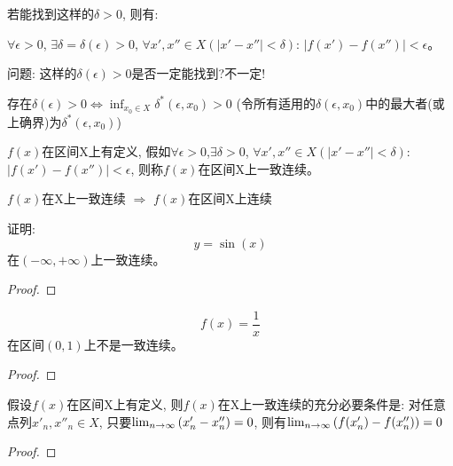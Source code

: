 \documentclass[lang=cn]{elegantbook}
\begin{document}
若能找到这样的$\delta > 0$, 则有:

$\forall \epsilon > 0$, $\exists \delta = \delta(\epsilon) > 0$, $\forall x', x'' \in X(\left| x' - x'' \right| < \delta)$: $\left| f(x') - f(x'') \right| < \epsilon$。

问题: 这样的$\delta(\epsilon) > 0$是否一定能找到?不一定!

存在$\delta(\epsilon) > 0 \Longleftrightarrow \inf_{x_0 \in X}\delta^*(\epsilon, x_0) > 0$ (令所有适用的$\delta(\epsilon, x_0)$中的最大者(或上确界)为$\delta^*(\epsilon, x_0)$)

\begin{definition}[一致连续]
    $f(x)$在区间X上有定义, 假如$\forall \epsilon > 0$,$\exists \delta > 0$, $\forall x', x'' \in X(\left| x' - x'' \right| < \delta)$: $\left| f(x') - f(x'') \right| < \epsilon$, 则称$f(x)$在区间X上一致连续。
\end{definition}
$f(x)$在X上一致连续 $\Rightarrow$ $f(x)$在区间X上连续

\begin{proposition}
    证明:
    \[ y = \sin(x) \]
    在$(-\infty, +\infty)$上一致连续。
\end{proposition}
\begin{proof}
    
\end{proof}

\begin{proposition}
    \[ f(x) = \frac{1}{x} \]
    在区间$(0, 1)$上不是一致连续。
\end{proposition}
\begin{proof}
    
\end{proof}

\begin{theorem}
    假设$f(x)$在区间X上有定义, 则$f(x)$在X上一致连续的充分必要条件是: 对任意点列$x'_n, x''_n \in X$, 只要$\lim_{n \to \infty } \left( x'_n - x''_n \right) = 0$, 则有$\lim_{n \to \infty } \left(f(x'_n) - f(x''_n) \right) = 0$
\end{theorem}
\begin{proof}
    
\end{proof}
\end{document}
